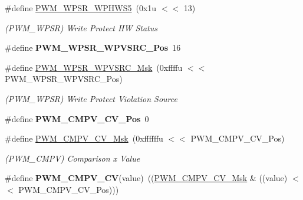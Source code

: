\begin{DoxyCompactItemize}
\mbox{\label{group__SAME70__PWM_ga3b73f74236c8fefeb78205a385c9a895}} 
\#define \mbox{\hyperlink{group__SAME70__PWM_ga3b73f74236c8fefeb78205a385c9a895}{P\+W\+M\+\_\+\+W\+P\+S\+R\+\_\+\+W\+P\+H\+W\+S5}}~(0x1u $<$$<$ 13)
\begin{DoxyCompactList}\small\item\em (P\+W\+M\+\_\+\+W\+P\+SR) Write Protect HW Status \end{DoxyCompactList}\item 
\mbox{\label{group__SAME70__PWM_ga0094684a5f44b6b03640baa9fdc6135f}} 
\#define {\bfseries P\+W\+M\+\_\+\+W\+P\+S\+R\+\_\+\+W\+P\+V\+S\+R\+C\+\_\+\+Pos}~16
\item 
\mbox{\label{group__SAME70__PWM_gac48a1ab59a4e311dbdd1abba533a1ef2}} 
\#define \mbox{\hyperlink{group__SAME70__PWM_gac48a1ab59a4e311dbdd1abba533a1ef2}{P\+W\+M\+\_\+\+W\+P\+S\+R\+\_\+\+W\+P\+V\+S\+R\+C\+\_\+\+Msk}}~(0xffffu $<$$<$ P\+W\+M\+\_\+\+W\+P\+S\+R\+\_\+\+W\+P\+V\+S\+R\+C\+\_\+\+Pos)
\begin{DoxyCompactList}\small\item\em (P\+W\+M\+\_\+\+W\+P\+SR) Write Protect Violation Source \end{DoxyCompactList}\item 
\mbox{\label{group__SAME70__PWM_ga4299c4528ffdef7d23c13e1e9a975bee}} 
\#define {\bfseries P\+W\+M\+\_\+\+C\+M\+P\+V\+\_\+\+C\+V\+\_\+\+Pos}~0
\item 
\mbox{\label{group__SAME70__PWM_ga6f836e7af802c562b6c84db59f333e93}} 
\#define \mbox{\hyperlink{group__SAME70__PWM_ga6f836e7af802c562b6c84db59f333e93}{P\+W\+M\+\_\+\+C\+M\+P\+V\+\_\+\+C\+V\+\_\+\+Msk}}~(0xffffffu $<$$<$ P\+W\+M\+\_\+\+C\+M\+P\+V\+\_\+\+C\+V\+\_\+\+Pos)
\begin{DoxyCompactList}\small\item\em (P\+W\+M\+\_\+\+C\+M\+PV) Comparison x Value \end{DoxyCompactList}\item 
\mbox{\label{group__SAME70__PWM_ga91c785b8594eae01c0c8b1c52b823f36}} 
\#define {\bfseries P\+W\+M\+\_\+\+C\+M\+P\+V\+\_\+\+CV}(value)~((\mbox{\hyperlink{group__SAMV71__PWM_ga6f836e7af802c562b6c84db59f333e93}{P\+W\+M\+\_\+\+C\+M\+P\+V\+\_\+\+C\+V\+\_\+\+Msk}} \& ((value) $<$$<$ P\+W\+M\+\_\+\+C\+M\+P\+V\+\_\+\+C\+V\+\_\+\+Pos)))

\end{DoxyCompactItemize}
